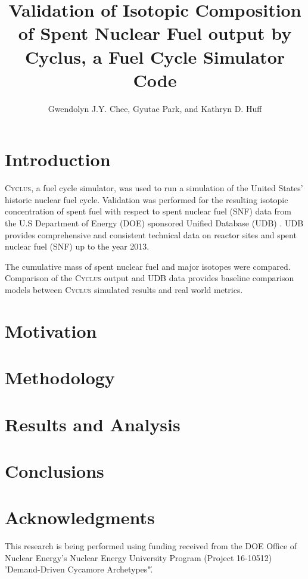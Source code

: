 \documentclass{anstrans}
\title{Validation of Isotopic Composition of Spent Nuclear Fuel output by Cyclus, a Fuel Cycle Simulator Code}
\author{Gwendolyn J.Y. Chee, Gyutae Park, and Kathryn D. Huff}
\institute{
Dept. of Nuclear, Plasma and Radiological Engineering, University of Illinois at Urbana-Champaign \\
gchee2@illinois.edu
}
\newcommand{\Cyclus}{\textsc{Cyclus}\xspace}%
\begin{document}
\section{Introduction}
\Cyclus \cite{huff_fundamentals_2016}, a fuel cycle simulator, was used to run a simulation of the
United States' historic nuclear fuel cycle. Validation was performed for the resulting isotopic
concentration of spent fuel with respect to spent nuclear fuel (SNF) data from the U.S Department of
Energy (DOE) sponsored Unified Database (UDB) \cite{Peterson_UNF_2017}.  UDB provides
comprehensive and consistent technical data on reactor sites and spent nuclear fuel (SNF) up to the
year 2013.

The cumulative mass of spent nuclear fuel and major isotopes were compared. Comparison of the
\Cyclus output and UDB data provides baseline comparison models between \Cyclus simulated
results and real world metrics.

\section{Motivation}


\section{Methodology}


\section{Results and Analysis}


\section{Conclusions}

\section{Acknowledgments}
This research is being performed using funding received from the DOE Office of Nuclear Energy's Nuclear Energy University Program (Project 16-10512) 'Demand-Driven Cycamore Archetypes"\'.



\end{document}
